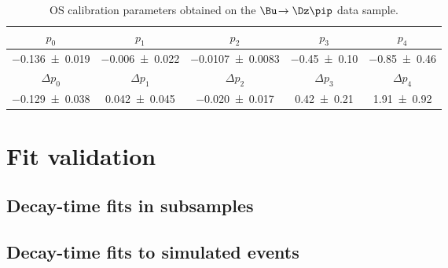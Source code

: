 \begin{table}[tbp]
	\centering
	\caption{OS calibration parameters obtained on the $\Bu\!\to\Dz\pip$ data sample.}
	\begin{tabular}{ccccc}
		\toprule
		$p_0$ & $p_1$ & $p_2$ & $p_3$ & $p_4$ \\
		\midrule
		\num{-0.136\pm0.019}  & \num{-0.006\pm0.022} & \num{-0.0107\pm0.0083} &\num{-0.45\pm0.10} &\num{-0.85\pm0.46}\\
		\midrule
		$\Delta p_0$ & $\Delta p_1$ & $\Delta p_2$ & $\Delta p_3$ & $\Delta p_4$ \\
		\midrule
		\num{-0.129\pm0.038}  & \num{0.042\pm0.045} & \num{-0.020\pm0.017} &\num{0.42\pm0.21} &\num{1.91\pm0.92}\\
		\bottomrule
	\end{tabular}
	\label{tab:DecTimeProjection}
\end{table}


\section{Fit validation}
\label{sec:decTimeFitVal}


\subsection{Decay-time fits in subsamples}


\subsection{Decay-time fits to simulated events}
